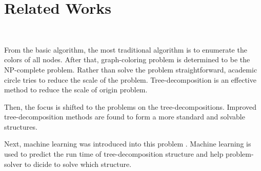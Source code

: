 \section{Related Works}~\label{sec.relatedworks}

From the basic algorithm, the most traditional algorithm is to enumerate the colors of all nodes. After that, graph-coloring problem is determined to be the NP-complete problem. Rather than solve the problem straightforward, academic circle tries to reduce the scale of the problem. Tree-decomposition is an effective method\cite{BasicTD1991} to reduce the scale of origin problem.

Then, the focus is shifted to the problems on the tree-decompositions. Improved tree-decomposition methods are found \cite{BHL1996LinearTreeDeomposition}\cite{BHL1991BetterAlgoTreeWidth}\cite{FasterTD2019} to form a more standard and solvable structures.

Next, machine learning was introduced into this problem \cite{MLonTD2017}. Machine learning is used to predict the run time of tree-decomposition structure and help problem-solver to dicide to solve which structure.